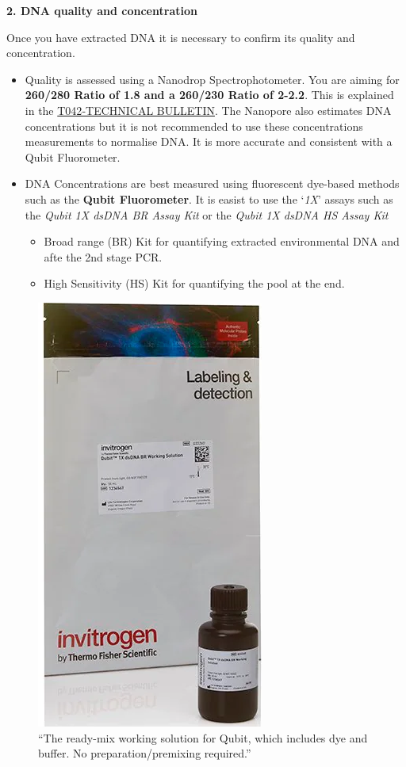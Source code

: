 \documentclass[
]{book}
\providecommand{\tightlist}{%
  \setlength{\itemsep}{0pt}\setlength{\parskip}{0pt}}
\begin{document}
\textbf{2. DNA quality and concentration}

Once you have extracted DNA it is necessary to confirm its quality and concentration.

\begin{itemize}
\tightlist
\item
  Quality is assessed using a Nanodrop Spectrophotometer. You are aiming for \textbf{260/280 Ratio of 1.8 and a 260/230 Ratio of 2-2.2}. This is explained in the \href{https://dna.uga.edu/wp-content/uploads/sites/51/2019/02/Note-on-the-260_280-and-260_230-Ratios.pdf}{T042‐TECHNICAL BULLETIN}. The Nanopore also estimates DNA concentrations but it is not recommended to use these concentrations measurements to normalise DNA. It is more accurate and consistent with a Qubit Fluorometer.\\
\item
  DNA Concentrations are best measured using fluorescent dye-based methods such as the \textbf{Qubit Fluorometer}. It is easist to use the `\emph{1X}' assays such as the \emph{Qubit 1X dsDNA BR Assay Kit} or the \emph{Qubit 1X dsDNA HS Assay Kit}

  \begin{itemize}
  \tightlist
  \item
    Broad range (BR) Kit for quantifying extracted environmental DNA and afte the 2nd stage PCR.
  \item
    High Sensitivity (HS) Kit for quantifying the pool at the end.
  \end{itemize}
\end{itemize}

\begin{figure}
\centering
\includegraphics{./img/qubit.png}
\caption{``The ready-mix working solution for Qubit, which includes dye and buffer. No preparation/premixing required.''}
\end{figure}
\end{document}
